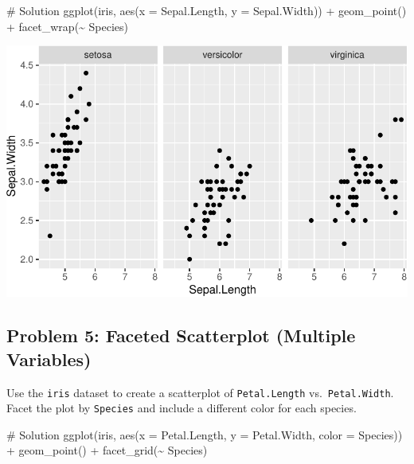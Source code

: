 \documentclass[
  letterpaper,
  DIV=11,
  numbers=noendperiod]{scrreprt}
\newenvironment{Shaded}{\begin{snugshade}}{\end{snugshade}}
\newcommand{\AttributeTok}[1]{\textcolor[rgb]{0.40,0.45,0.13}{#1}}
\newcommand{\CommentTok}[1]{\textcolor[rgb]{0.37,0.37,0.37}{#1}}
\newcommand{\FunctionTok}[1]{\textcolor[rgb]{0.28,0.35,0.67}{#1}}
\newcommand{\NormalTok}[1]{\textcolor[rgb]{0.00,0.23,0.31}{#1}}
\newcommand{\SpecialCharTok}[1]{\textcolor[rgb]{0.37,0.37,0.37}{#1}}
\begin{document}
\begin{Shaded}
\begin{Highlighting}[]
\CommentTok{\# Solution}
\FunctionTok{ggplot}\NormalTok{(iris, }\FunctionTok{aes}\NormalTok{(}\AttributeTok{x =}\NormalTok{ Sepal.Length, }\AttributeTok{y =}\NormalTok{ Sepal.Width)) }\SpecialCharTok{+}
  \FunctionTok{geom\_point}\NormalTok{() }\SpecialCharTok{+}
  \FunctionTok{facet\_wrap}\NormalTok{(}\SpecialCharTok{\textasciitilde{}}\NormalTok{ Species)}
\end{Highlighting}
\end{Shaded}

\includegraphics{Advanced_Scatterplot_Techniques_files/figure-pdf/unnamed-chunk-23-1.pdf}

\subsection*{Problem 5: Faceted Scatterplot (Multiple
Variables)}\label{problem-5-faceted-scatterplot-multiple-variables}

Use the \texttt{iris} dataset to create a scatterplot of
\texttt{Petal.Length} vs.~\texttt{Petal.Width}. Facet the plot by
\texttt{Species} and include a different color for each species.

\begin{Shaded}
\begin{Highlighting}[]
\CommentTok{\# Solution}
\FunctionTok{ggplot}\NormalTok{(iris, }\FunctionTok{aes}\NormalTok{(}\AttributeTok{x =}\NormalTok{ Petal.Length, }\AttributeTok{y =}\NormalTok{ Petal.Width, }\AttributeTok{color =}\NormalTok{ Species)) }\SpecialCharTok{+}
  \FunctionTok{geom\_point}\NormalTok{() }\SpecialCharTok{+}
  \FunctionTok{facet\_grid}\NormalTok{(}\SpecialCharTok{\textasciitilde{}}\NormalTok{ Species)}
\end{Highlighting}
\end{Shaded}
\end{document}
